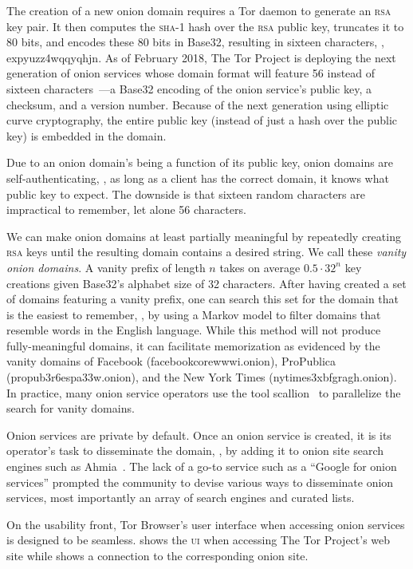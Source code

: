 The creation of a new onion domain requires a Tor daemon to generate an
\textsc{rsa} key pair.  It then computes the \textsc{sha}-1 hash over the
\textsc{rsa} public key, truncates it to 80 bits, and encodes these 80 bits in
Base32, resulting in sixteen characters, \eg, expyuzz4wqqyqhjn.  As of February
2018, The Tor Project is deploying the next generation of onion services whose
domain format will feature 56 instead of sixteen
characters~\cite[\S~6]{Mathewson2013a}---a Base32 encoding of the onion
service's public key, a checksum, and a version number.  Because of the next
generation using elliptic curve cryptography, the entire public key (instead of
just a hash over the public key) is embedded in the domain.

Due to an onion domain's being a function of its public key, onion domains are
self-authenticating, \ie, as long as a client has the correct domain, it knows
what public key to expect.  The downside is that sixteen random characters are
impractical to remember, let alone 56 characters.

We can make onion domains at least partially meaningful by repeatedly creating
\textsc{rsa} keys until the resulting domain contains a desired string.  We call
these \emph{vanity onion domains}.  A vanity prefix of length $n$ takes on
average $0.5 \cdot 32^n$ key creations given Base32's alphabet size of 32
characters.  After having created a set of domains featuring a vanity prefix,
one can search this set for the domain that is the easiest to remember, \eg, by
using a Markov model to filter domains that resemble words in the English
language.  While this method will not produce fully-meaningful domains, it can
facilitate memorization as evidenced by the vanity domains of Facebook
(facebookcorewwwi.onion), ProPublica (propub3r6espa33w.onion), and the New York
Times (nytimes3xbfgragh.onion).  In practice, many onion service operators use
the tool scallion~\cite{scallion} to parallelize the search for vanity domains.

Onion services are private by default.  Once an onion service is created, it is
its operator's task to disseminate the domain, \eg, by adding it to onion site
search engines such as Ahmia~\cite{ahmia}.  The lack of a go-to service such as
a ``Google for onion services'' prompted the community to devise various ways to
disseminate onion services, most importantly an array of search engines and
curated lists.

On the usability front, Tor Browser's user interface when accessing onion
services is designed to be seamless.   shows the
\textsc{ui} when accessing The Tor Project's web site while
 shows a connection to the corresponding onion site.

